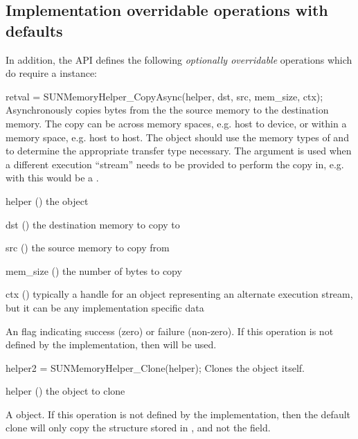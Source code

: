 %
%
\subsection{Implementation overridable operations with defaults}\label{ss:sunmemory_overridable_ops}

In addition, the  API defines the following \textit{optionally
overridable} operations which do require a  instance:

{
  retval = SUNMemoryHelper\_CopyAsync(helper, dst, src, mem\_size, ctx);
}
{
  Asynchronously copies  bytes from the the source memory to the
  destination memory.  The copy can be across memory spaces, e.g. host to
  device, or within a memory space, e.g. host to host.  The  object
  should use the memory types of  and  to determine the
  appropriate transfer type necessary.  The  argument is used when a
  different execution ``stream'' needs to be provided to perform the copy in,
  e.g. with  this would be a .
}
{
  \begin{args}
  \item[helper] () the  object
  \item[dst] () the destination memory to copy to
  \item[src] () the source memory to copy from
  \item[mem\_size] () the number of bytes to copy
  \item[ctx] () typically a handle for an object representing an
  alternate execution stream, but it can be any implementation specific data
  \end{args}
}
{
  An  flag indicating success (zero) or failure (non-zero).
}
{
  \warn If this operation is not defined by the implementation, then
   will be used.
}

{
  helper2 = SUNMemoryHelper\_Clone(helper);
}
{
  Clones the  object itself.
}
{
  \begin{args}[helper]
  \item[helper] () the  object to clone
  \end{args}
}
{
  A  object.
}
{
  \warn If this operation is not defined by the implementation, then the default
  clone will only copy the  structure stored in
  , and not the  field.
}

